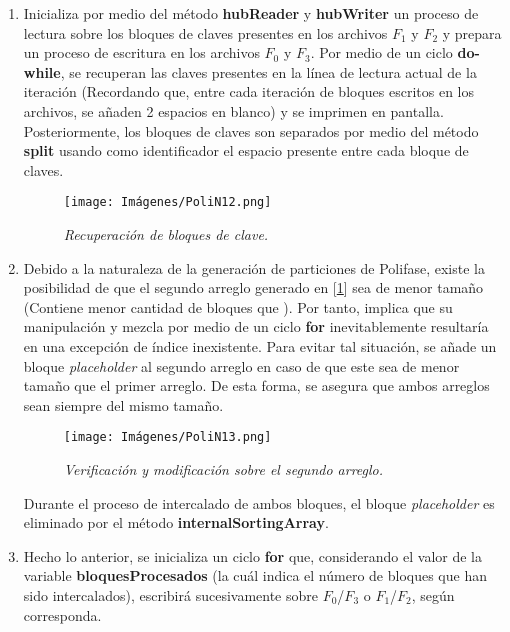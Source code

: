 \documentclass[letterpaper,12pt]{extarticle}
\begin{document}
\begin{itemize}
\begin{enumerate}
\item Inicializa por medio del método \textbf{hubReader} y \textbf{hubWriter} un proceso de lectura sobre los bloques de claves presentes en los archivos $F_{1}$ y $F_{2}$ y prepara un proceso de escritura en los archivos $F_{0}$ y $F_{3}$. Por medio de un ciclo \textbf{do-while}, se recuperan las claves presentes en la línea de lectura actual de la iteración (Recordando que, entre cada iteración de bloques escritos en los archivos, se añaden 2 espacios en blanco) y se imprimen en pantalla. Posteriormente, los bloques de claves son separados por medio del método \textbf{split} usando como identificador el espacio presente entre cada bloque de claves. 

\begin{figure}[h!]
\centering
\texttt{[image: Imágenes/PoliN12.png]}
\caption{\textit{Recuperación de bloques de clave.}}
\label{fig:PoliN12}
\end{figure}

\item Debido a la naturaleza de la generación de particiones de Polifase, existe la posibilidad de que el segundo arreglo generado en [\ref{fig:PoliN12}] sea
de menor tamaño (Contiene menor cantidad de bloques que ). Por tanto, implica que su manipulación y mezcla por medio de un ciclo \textbf{for} inevitablemente resultaría en una excepción de índice inexistente. Para evitar tal situación, se añade un bloque \textit{placeholder} al segundo arreglo en caso de que este sea de menor tamaño que el primer arreglo. De esta forma, se asegura que ambos arreglos sean siempre del mismo tamaño.

\begin{figure}[h!]
\centering
\texttt{[image: Imágenes/PoliN13.png]}
\caption{\textit{Verificación y modificación sobre el segundo arreglo.}}
\label{fig:PoliN13}
\end{figure}

Durante el proceso de intercalado de ambos bloques, el bloque \textit{placeholder} es eliminado por el método \textbf{internalSortingArray}.


\item Hecho lo anterior, se inicializa un ciclo \textbf{for} que, considerando el valor de la variable \textbf{bloquesProcesados} (la cuál indica el número de bloques que han sido intercalados), escribirá sucesivamente sobre $F_{0}$/$F_{3}$ o $F_{1}$/$F_{2}$, según corresponda. 


\end{enumerate}
\end{itemize}
\end{document}
